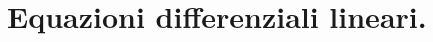 \section{Equazioni differenziali lineari.}
\label{EquazioniDifferenziali_EquazioniDifferenzialiLineari}


